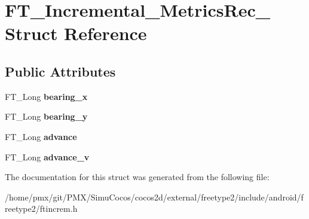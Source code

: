\hypertarget{structFT__Incremental__MetricsRec__}{}\section{F\+T\+\_\+\+Incremental\+\_\+\+Metrics\+Rec\+\_\+ Struct Reference}
\label{structFT__Incremental__MetricsRec__}
\subsection*{Public Attributes}
\begin{DoxyCompactItemize}
\item 
\mbox{\label{structFT__Incremental__MetricsRec___af065d998d0a0f2a57513125038d802a6}} 
F\+T\+\_\+\+Long {\bfseries bearing\+\_\+x}
\item 
\mbox{\label{structFT__Incremental__MetricsRec___af1443aa7c1ca54d3c2a29f1cf6d7848b}} 
F\+T\+\_\+\+Long {\bfseries bearing\+\_\+y}
\item 
\mbox{\label{structFT__Incremental__MetricsRec___a996c99aa0e6b36c2c7776fc1a2b6b614}} 
F\+T\+\_\+\+Long {\bfseries advance}
\item 
\mbox{\label{structFT__Incremental__MetricsRec___a0ee280662a03ea935dbfe377e56f4d6d}} 
F\+T\+\_\+\+Long {\bfseries advance\+\_\+v}
\end{DoxyCompactItemize}


The documentation for this struct was generated from the following file\+:\begin{DoxyCompactItemize}
\item 
/home/pmx/git/\+P\+M\+X/\+Simu\+Cocos/cocos2d/external/freetype2/include/android/freetype2/ftincrem.\+h\end{DoxyCompactItemize}
